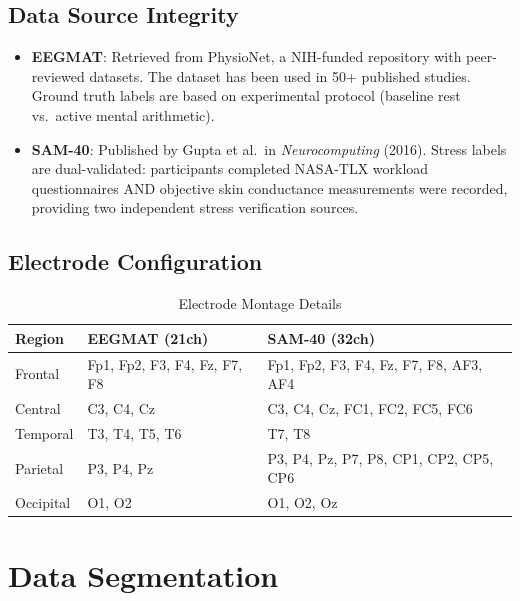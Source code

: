 \documentclass[11pt,a4paper]{article}
\begin{document}
\subsection{Data Source Integrity}

\begin{itemize}[leftmargin=*]
\item \textbf{EEGMAT}: Retrieved from PhysioNet, a NIH-funded repository with peer-reviewed datasets. The dataset has been used in 50+ published studies. Ground truth labels are based on experimental protocol (baseline rest vs.\ active mental arithmetic).
\item \textbf{SAM-40}: Published by Gupta et al.\ in \textit{Neurocomputing} (2016). Stress labels are dual-validated: participants completed NASA-TLX workload questionnaires AND objective skin conductance measurements were recorded, providing two independent stress verification sources.
\end{itemize}

\subsection{Electrode Configuration}

\begin{table}[H]
\centering
\caption{Electrode Montage Details}
\small
\begin{tabular}{lll}
\toprule
\textbf{Region} & \textbf{EEGMAT (21ch)} & \textbf{SAM-40 (32ch)} \\
\midrule
Frontal & Fp1, Fp2, F3, F4, Fz, F7, F8 & Fp1, Fp2, F3, F4, Fz, F7, F8, AF3, AF4 \\
Central & C3, C4, Cz & C3, C4, Cz, FC1, FC2, FC5, FC6 \\
Temporal & T3, T4, T5, T6 & T7, T8 \\
Parietal & P3, P4, Pz & P3, P4, Pz, P7, P8, CP1, CP2, CP5, CP6 \\
Occipital & O1, O2 & O1, O2, Oz \\
\bottomrule
\end{tabular}
\end{table}

\section{Data Segmentation}
\end{document}
